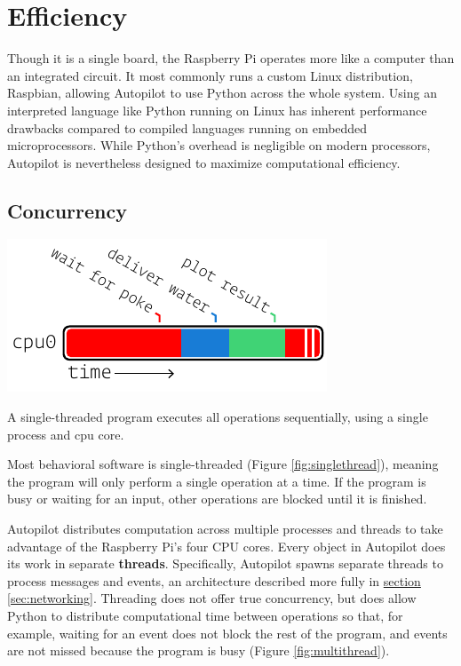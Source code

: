 \documentclass[nohyper, justified, notitlepage, marginals=raggedright,twoside=false,debug]{tufte-autopilot}
\begin{document}
\section{Efficiency}
\label{sec:efficiency}

Though it is a single board, the Raspberry Pi operates more like a computer than an integrated circuit. It most commonly runs a custom Linux distribution, Raspbian, allowing Autopilot to use Python across the whole system. Using an interpreted language like Python running on Linux has inherent performance drawbacks compared to compiled languages running on embedded microprocessors. While Python's overhead is negligible on modern processors, Autopilot is nevertheless designed to maximize computational efficiency.

\subsection{Concurrency}

\begin{marginfigure}[3.5cm]
\includegraphics[]{figures/side_12_onethread.pdf}
\caption{A single-threaded program executes all operations sequentially, using a single process and cpu core.}
\label{fig:singlethread}
\end{marginfigure}

Most behavioral software is single-threaded (Figure \ref{fig:singlethread}), meaning the program will only perform a single operation at a time. If the program is busy or waiting for an input, other operations are blocked until it is finished.

Autopilot distributes computation across multiple processes and threads to take advantage of the Raspberry Pi's four CPU cores. Every object in Autopilot does its work in separate \textbf{threads}. Specifically, Autopilot spawns separate threads to process messages and events, an architecture described more fully in \hyperref[sec:networking]{section \ref*{sec:networking}}. Threading does not offer true concurrency, but does allow Python to distribute computational time between operations so that, for example, waiting for an event does not block the rest of the program, and events are not missed because the program is busy (Figure \ref{fig:multithread}).
\end{document}

